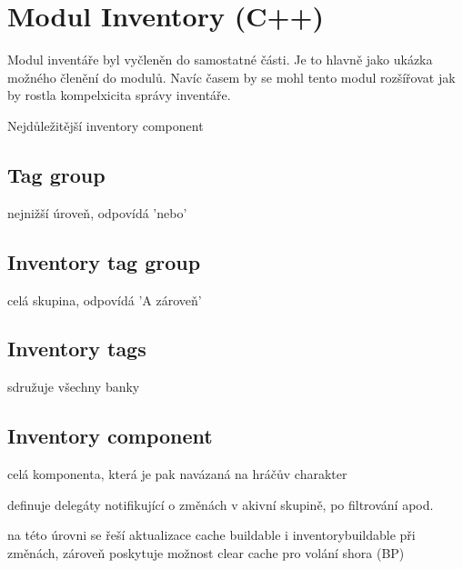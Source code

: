 


\section{Modul Inventory (C++)}

Modul inventáře byl vyčleněn do samostatné části. Je to hlavně jako ukázka možného členění do modulů. Navíc časem by se mohl tento modul rozšířovat jak by rostla kompelxicita správy inventáře.

Nejdůležitější inventory component


\subsection{Tag group}
nejnižší úroveň, odpovídá 'nebo'

\subsection{Inventory tag group}

celá skupina, odpovídá 'A zároveň'

\subsection{Inventory tags}

sdružuje všechny banky

\subsection{Inventory component}

celá komponenta, která je pak navázaná na hráčův charakter

definuje delegáty notifikující o změnách v akivní skupině, po filtrování apod.

na této úrovni se řeší aktualizace cache buildable i inventorybuildable při změnách, zároveň poskytuje možnost clear cache pro volání shora (BP)

